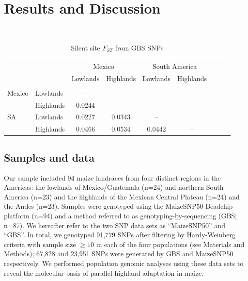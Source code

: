 \section*{Results and Discussion}

\renewcommand{\arraystretch}{1.1}
\begin{table}[tb]

\begin{center}
 \caption[]{Silent site $F_{ST}$ from GBS SNPs \hspace*{2.3cm}}
  \textbf{}\\[-2mm]
{\fontsize{7}{9}\sf
    \begin{tabular}{llccccccl}
    \hline
    & & \\[-3mm]
	&		&	\multicolumn{2}{c}{Mexico}		&	\multicolumn{2}{c}{South America}		\\
	&		&	Lowlands	&	Highlands	&	Lowlands	&	Highlands	\\
      \hline
    & & \\[-3mm]
Mexico	&	Lowlands	&	--	&		&		&		\\
	&	Highlands	&	0.0244	&	--	&		&		\\
SA	&	Lowlands	&	0.0227	&	0.0343	&	--	&		\\
	&	Highlands	&	0.0466	&	0.0534	&	0.0442	&	--	\\ [1mm]
    \hline
    \end{tabular}
    \label{FstP}  %
}
\end{center}
\end{table}
\renewcommand{\arraystretch}{1}

\subsection*{Samples and data}

Our sample included 94 maize landraces from four distinct regions in the Americas: the lowlands of Mexico/Guatemala (n=24) and northern South America (n=23) and the highlands of the Mexican Central Plateau (n=24) and the Andes (n=23). Samples were genotyped using the MaizeSNP50 Beadchip platform (n=94) and a method referred to as \underline{g}enotyping-\underline{b}y-\underline{s}equencing (GBS; n=87). 
We hereafter refer to the two SNP data sets as ``MaizeSNP50'' and ``GBS''.
In total, we genotyped 91,779 SNPs after filtering by Hardy-Weinberg criteria with sample size $\geq10$ in each of the four populations (see Materials and Methods); 67,828 and 23,951 SNPs were generated by GBS and MaizeSNP50 respectively.  
We performed population genomic analyses using these data sets to reveal the molecular basis of parallel highland adaptation in maize.

